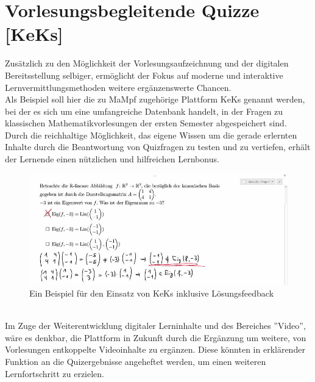 \documentclass{scrreprt}
\begin{document}
\section{Vorlesungsbegleitende Quizze [KeKs]}
Zusätzlich zu den Möglichkeit der Vorlesungsaufzeichnung und der digitalen Bereitsstellung selbiger, ermöglicht der Fokus auf moderne und interaktive Lernvermittlungsmethoden weitere ergänzenswerte Chancen.\\
Als Beispiel soll hier die zu MaMpf zugehörige Plattform KeKs genannt werden, bei der es sich um eine umfangreiche Datenbank handelt, in der Fragen zu klassischen Mathematikvorlesungen  der  ersten  Semester  abgespeichert sind. Durch die reichhaltige Möglichkeit, das eigene Wissen um die gerade erlernten Inhalte durch die Beantwortung von Quizfragen zu testen und zu vertiefen, erhält der Lernende einen nützlichen und hilfreichen Lernbonus.\\
\begin{figure}[h]
    \centering
    \includegraphics[width=1\textwidth]{quiz_erklaerung.png}
    \caption{Ein Beispiel für den Einsatz von KeKs inklusive Lösungsfeedback}
    \label{fig:quiz_erklaerung}
\end{figure}
\\
Im Zuge der Weiterentwicklung digitaler Lerninhalte und des Bereiches ''Video'', wäre es denkbar, die Plattform in Zukunft durch die Ergänzung um weitere, von Vorlesungen entkoppelte Videoinhalte zu ergänzen. Diese könnten in erklärender Funktion an die Quizergebnisse angeheftet werden, um einen weiteren Lernfortschritt zu erzielen. 
\end{document}
